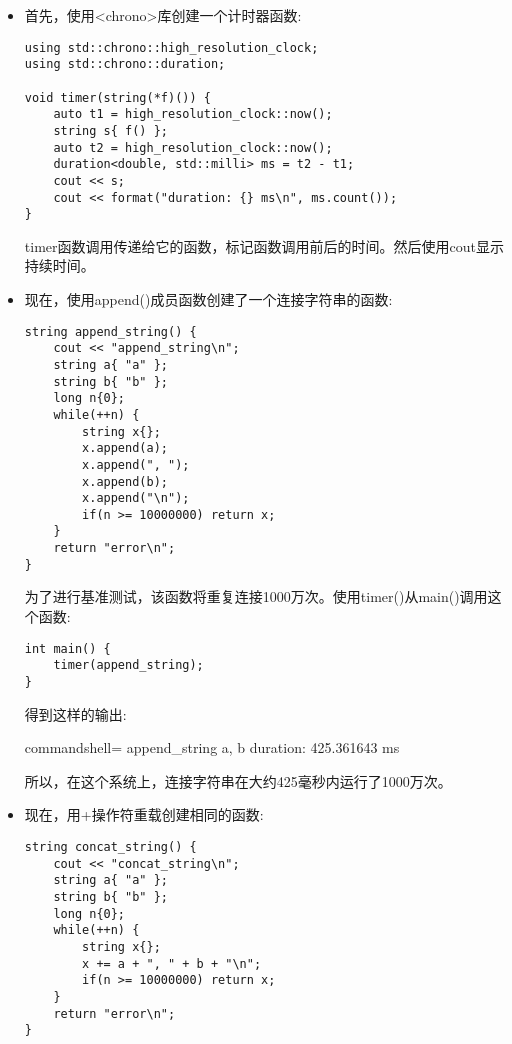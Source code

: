 \begin{itemize}
\item 
首先，使用<chrono>库创建一个计时器函数:

\begin{lstlisting}[style=styleCXX]
using std::chrono::high_resolution_clock;
using std::chrono::duration;

void timer(string(*f)()) {
	auto t1 = high_resolution_clock::now();
	string s{ f() };
	auto t2 = high_resolution_clock::now();
	duration<double, std::milli> ms = t2 - t1;
	cout << s;
	cout << format("duration: {} ms\n", ms.count());
}
\end{lstlisting}

timer函数调用传递给它的函数，标记函数调用前后的时间。然后使用cout显示持续时间。

\item 
现在，使用append()成员函数创建了一个连接字符串的函数:

\begin{lstlisting}[style=styleCXX]
string append_string() {
	cout << "append_string\n";
	string a{ "a" };
	string b{ "b" };
	long n{0};
	while(++n) {
		string x{};
		x.append(a);
		x.append(", ");
		x.append(b);
		x.append("\n");
		if(n >= 10000000) return x;
	}
	return "error\n";
}
\end{lstlisting}

为了进行基准测试，该函数将重复连接1000万次。使用timer()从main()调用这个函数:

\begin{lstlisting}[style=styleCXX]
int main() {
	timer(append_string);
}
\end{lstlisting}

得到这样的输出:

\begin{tcblisting}{commandshell={}}
append_string
a, b
duration: 425.361643 ms
\end{tcblisting}

所以，在这个系统上，连接字符串在大约425毫秒内运行了1000万次。

\item 
现在，用+操作符重载创建相同的函数:

\begin{lstlisting}[style=styleCXX]
string concat_string() {
	cout << "concat_string\n";
	string a{ "a" };
	string b{ "b" };
	long n{0};
	while(++n) {
		string x{};
		x += a + ", " + b + "\n";
		if(n >= 10000000) return x;
	}
	return "error\n";
}
\end{lstlisting}


\end{itemize}
